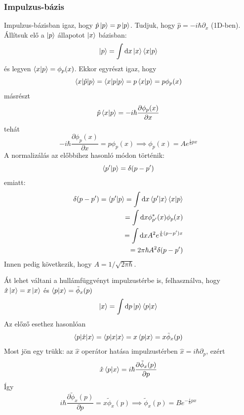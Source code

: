 \subsubsection{Impulzus-bázis}
Impulzus-bázisban igaz, hogy $\hat p \ket p = p\ket p$. Tudjuk, hogy $\hat p = -i\hbar\partial_x$ (1D-ben).
Állítsuk elő a $\ket p$ állapotot $\ket x$ bázisban:
\begin{equation}
    \ket p = \int\textrm{d} x \ket x \braket{x|p}
\end{equation}
és legyen $\braket{x|p}=\phi_p(x)$. Ekkor egyrészt igaz, hogy
\begin{equation}
    \braket{x|\hat p|p} = \braket{x|p|p} = p\braket{x|p} = p\phi_p(x)
\end{equation}
másrészt
\begin{equation}
    \hat p \braket{x|p} = -i\hbar\frac{\partial \phi_p(x)}{\partial x} 
\end{equation}
tehát
\begin{equation}
    -i\hbar\frac{\partial \phi_p(x)}{\partial x} =  p\phi_p(x) \implies \phi_p(x) = A e^{\frac{i}{\hbar} px}
\end{equation}
A normalizálás az előbbihez hasonló módon történik:
\begin{equation}
    \braket{p'|p} = \delta(p-p')
\end{equation}
emiatt:
\begin{eqnarray}
    \delta(p-p') = \braket{p'|p} = \int\textrm{d} x \braket{p'|x}\braket{x|p} \\
    = \int\textrm{d} x \phi_{p'}^{*}(x)\phi_p(x) \\
    = \int\textrm{d} x A^2 e^{\frac{i}{\hbar} (p-p') x} \\
    = 2\pi\hbar A^2 \delta (p-p')
\end{eqnarray}
Innen pedig következik, hogy $A=1/\sqrt{2\pi\hbar}$.

Át lehet váltani a hullámfüggvényt impulzustérbe is, felhasználva, hogy $\hat x\ket x = x\ket x$ és $\braket{p|x}=\tilde\phi_x(p)$
\begin{equation}
    \ket x = \int\textrm{d} p \ket p \braket{p|x}
\end{equation}
Az előző esethez hasonlóan
\begin{equation}
    \braket{p|\hat x|x} = \braket{p|x|x} = x \braket{p|x} = x\tilde\phi_x(p)
\end{equation}
Most jön egy trükk: az $\hat x$ operátor hatása impulzustérben $\hat x = i\hbar\partial_p$, ezért
\begin{equation}
    \hat x \braket{p|x} = i\hbar \frac{\partial\tilde\phi_x(p)}{\partial p}
\end{equation}
Így 
\begin{equation}
    i\hbar \frac{\partial\tilde\phi_x(p)}{\partial p} = x\tilde\phi_x(p) \implies \tilde\phi_x(p) = B e^{-\frac{i}{\hbar}px}
\end{equation}

